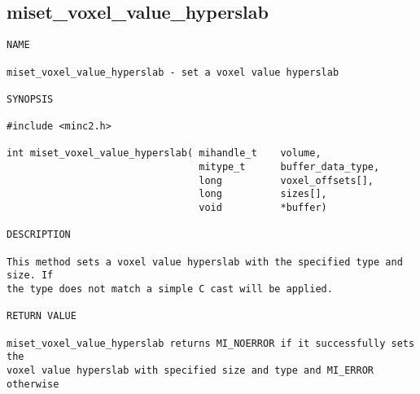 \documentclass{article}
\begin{document}
\subsection{miset\_voxel\_value\_hyperslab}
\begin{verbatim}
NAME

miset_voxel_value_hyperslab - set a voxel value hyperslab

SYNOPSIS

#include <minc2.h>

int miset_voxel_value_hyperslab( mihandle_t    volume,
                                 mitype_t      buffer_data_type,
                                 long          voxel_offsets[],
                                 long          sizes[],
                                 void          *buffer)

DESCRIPTION

This method sets a voxel value hyperslab with the specified type and size. If
the type does not match a simple C cast will be applied.

RETURN VALUE

miset_voxel_value_hyperslab returns MI_NOERROR if it successfully sets the
voxel value hyperslab with specified size and type and MI_ERROR otherwise
\end{verbatim}








\end{document}
